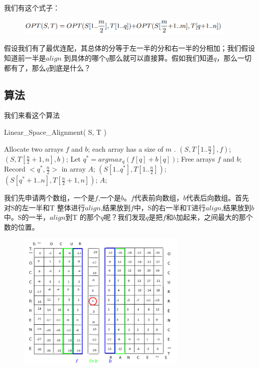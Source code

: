 我们有这个式子：
\begin{figure}[H]
\centering
\includegraphics[width=4.2in]{12.png}
\end{figure}
假设我们有了最优连配，其总体的分等于左一半的分和右一半的分相加；我们假设知道前一半是$align$ 到具体的哪个$q$那么就可以直接算。假如我们知道$q$，那么一切都有了，那么$q$到底是什么？

\subsection{算法}
我们来看这个算法

\sc Linear\_Space\_Alignment( S, T )
\begin{algorithmic}[1]
\STATE Allocate two arrays $f$ and $b$; each array has a size of $m$ .
$( S, T[1..\frac{n}{2}], f)$;
$( S, T[\frac{n}{2}+1, n], b)$;
\STATE Let $q^* = argmax_q ( f[q] + b[q] )$;
\STATE Free arrays $f$ and $b$;
\STATE Record $<q^*, \frac{n}{2}>$ in array $A$;
$( S[1..q^*], T[1..\frac{n}{2}] )$;
$( S[q^*+1..n], T[\frac{n}{2}+1, n] )$;
\RETURN $A$;
\end{algorithmic}

我们先申请两个数组，一个是$f$,一个是$b$。$f$代表前向数组，$b$代表后向数组。首先对S的左一半和T 整体进行$align$,结果放到$f $中，S的右一半和T进行$align$,结果放到$b$中。S的一半，$align$到T 的那个$q$呢？我们发现$q$是把$f$和$b$加起来，之间最大的那个数的位置。
\begin{figure}[H]
\centering
\includegraphics[width=3.2in]{13.png}
\end{figure}

